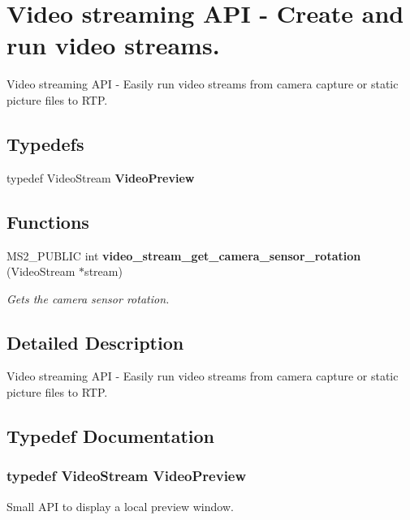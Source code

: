 \section{Video streaming API -\/ Create and run video streams.}
\label{group__video__stream__api}


Video streaming API -\/ Easily run video streams from camera capture or static picture files to RTP.  
\subsection*{Typedefs}
\begin{DoxyCompactItemize}
\item 
typedef VideoStream {\bf VideoPreview}
\end{DoxyCompactItemize}
\subsection*{Functions}
\begin{DoxyCompactItemize}
\item 
MS2\_\-PUBLIC int {\bf video\_\-stream\_\-get\_\-camera\_\-sensor\_\-rotation} (VideoStream $\ast$stream)
\begin{DoxyCompactList}\small\item\em Gets the camera sensor rotation. \item\end{DoxyCompactList}\end{DoxyCompactItemize}


\subsection{Detailed Description}
Video streaming API -\/ Easily run video streams from camera capture or static picture files to RTP. 

\subsection{Typedef Documentation}
\subsubsection[{VideoPreview}]{\setlength{\rightskip}{0pt plus 5cm}typedef VideoStream {\bf VideoPreview}}\label{group__video__stream__api_ga305d6ba6aa486545212ced06855c467a}
Small API to display a local preview window. 

